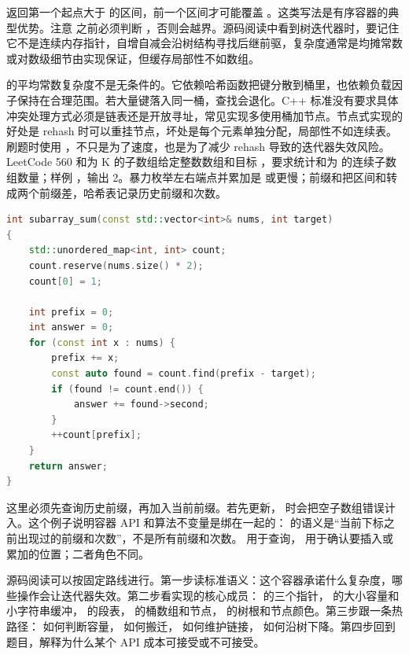  返回第一个起点大于  的区间，前一个区间才可能覆盖 。这类写法是有序容器的典型优势。注意  之前必须判断 ，否则会越界。源码阅读中看到树迭代器时，要记住它不是连续内存指针，自增自减会沿树结构寻找后继前驱，复杂度通常是均摊常数或对数级细节由实现保证，但缓存局部性不如数组。

 的平均常数复杂度不是无条件的。它依赖哈希函数把键分散到桶里，也依赖负载因子保持在合理范围。若大量键落入同一桶，查找会退化。C++ 标准没有要求具体冲突处理方式必须是链表还是开放寻址，常见实现多使用桶加节点。节点式实现的好处是 rehash 时可以重挂节点，坏处是每个元素单独分配，局部性不如连续表。刷题时使用 ，不只是为了速度，也是为了减少 rehash 导致的迭代器失效风险。LeetCode 560 和为 K 的子数组给定整数数组和目标 ，要求统计和为  的连续子数组数量；样例 ，输出 2。暴力枚举左右端点并累加是  或更慢；前缀和把区间和转成两个前缀差，哈希表记录历史前缀和次数。

\begin{lstlisting}[language=C++,caption={LeetCode 560 和为 K 的子数组：查询和更新顺序不能反}]
int subarray_sum(const std::vector<int>& nums, int target)
{
    std::unordered_map<int, int> count;
    count.reserve(nums.size() * 2);
    count[0] = 1;

    int prefix = 0;
    int answer = 0;
    for (const int x : nums) {
        prefix += x;
        const auto found = count.find(prefix - target);
        if (found != count.end()) {
            answer += found->second;
        }
        ++count[prefix];
    }
    return answer;
}
\end{lstlisting}

这里必须先查询历史前缀，再加入当前前缀。若先更新， 时会把空子数组错误计入。这个例子说明容器 API 和算法不变量是绑在一起的： 的语义是“当前下标之前出现过的前缀和次数”，不是所有前缀和次数。  用于查询， 用于确认要插入或累加的位置；二者角色不同。

源码阅读可以按固定路线进行。第一步读标准语义：这个容器承诺什么复杂度，哪些操作会让迭代器失效。第二步看实现的核心成员： 的三个指针， 的大小容量和小字符串缓冲， 的段表， 的桶数组和节点， 的树根和节点颜色。第三步跟一条热路径： 如何判断容量， 如何搬迁， 如何维护链接， 如何沿树下降。第四步回到题目，解释为什么某个 API 成本可接受或不可接受。

